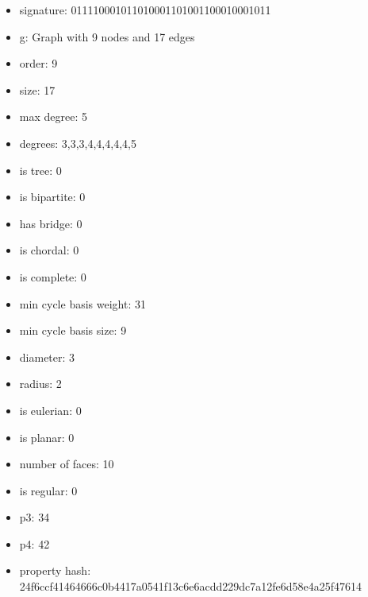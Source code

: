 \newpage
\begin{figure}
\end{figure}
\begin{itemize}
\item signature: 011110001011010001101001100010001011
\item g: Graph with 9 nodes and 17 edges
\item order: 9
\item size: 17
\item max degree: 5
\item degrees: 3,3,3,4,4,4,4,4,5
\item is tree: 0
\item is bipartite: 0
\item has bridge: 0
\item is chordal: 0
\item is complete: 0
\item min cycle basis weight: 31
\item min cycle basis size: 9
\item diameter: 3
\item radius: 2
\item is eulerian: 0
\item is planar: 0
\item number of faces: 10
\item is regular: 0
\item p3: 34
\item p4: 42
\item property hash: 24f6ccf41464666c0b4417a0541f13c6e6acdd229dc7a12fe6d58e4a25f47614
\end{itemize}
